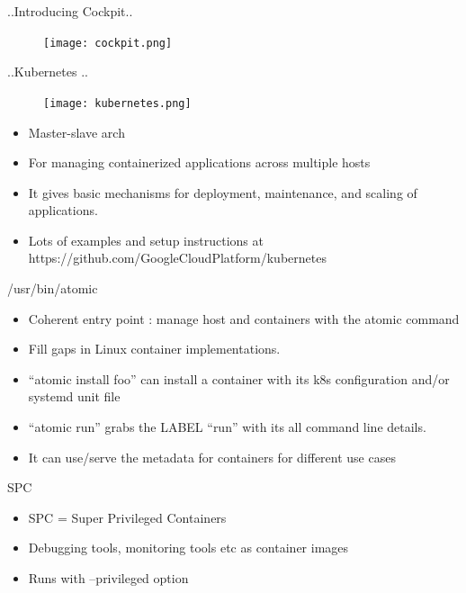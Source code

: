 \documentclass{beamer}
\begin{document}
\begin{frame}{..Introducing Cockpit..}
\begin{figure}[htp]
\centering
\texttt{[image: cockpit.png]}
\label{}
\end{figure}
\end{frame}

\begin{frame}{..Kubernetes ..}
\begin{figure}[htp]
\centering
\texttt{[image: kubernetes.png]}
\label{}
\end{figure}
\begin{itemize}
  \item Master-slave arch
  \item For managing containerized applications across multiple hosts
  \item It gives basic mechanisms for deployment, maintenance, and scaling of applications.
  \item Lots of examples and setup instructions at https://github.com/GoogleCloudPlatform/kubernetes
\end{itemize}
\end{frame}

\begin{frame}{/usr/bin/atomic}
\begin{itemize}
  \item Coherent entry point : manage host and containers with the atomic command
  \item Fill gaps in Linux container implementations.
  \item “atomic install foo” can install a container with its k8s configuration and/or systemd unit file
  \item “atomic run” grabs the LABEL “run” with its all command line details.
  \item It can use/serve the metadata for containers for different use cases
\end{itemize}
\end{frame}

\begin{frame}{SPC}
\begin{itemize}
  \item SPC = Super Privileged Containers
  \item Debugging tools, monitoring tools etc as container images
  \item Runs with --privileged option
\end{itemize}
\end{frame}
\end{document}
